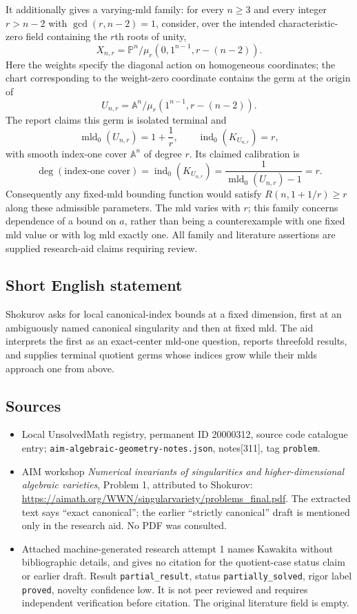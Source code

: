 \documentclass[11pt]{article}
\newcommand{\A}{\mathbb{A}}
\newcommand{\PP}{\mathbb{P}}
\begin{document}
It additionally gives a varying-mld family: for every $n\ge3$ and every integer $r>n-2$ with $\gcd(r,n-2)=1$, consider, over the intended characteristic-zero field containing the $r$th roots of unity,
\[X_{n,r}=\PP^n/\mu_r(0,1^{n-1},r-(n-2)).\]
Here the weights specify the diagonal action on homogeneous coordinates; the chart corresponding to the weight-zero coordinate contains the germ at the origin of
\[U_{n,r}=\A^n/\mu_r(1^{n-1},r-(n-2)).\]
The report claims this germ is isolated terminal and
\[\operatorname{mld}_0(U_{n,r})=1+\frac1r,\qquad\operatorname{ind}_0(K_{U_{n,r}})=r,\]
with smooth index-one cover $\A^n$ of degree $r$. Its claimed calibration is
\[\deg(\text{index-one cover})=\operatorname{ind}_0(K_{U_{n,r}})=\frac1{\operatorname{mld}_0(U_{n,r})-1}=r.\]
Consequently any fixed-mld bounding function would satisfy $R(n,1+1/r)\ge r$ along these admissible parameters. The mld varies with $r$; this family concerns dependence of a bound on $a$, rather than being a counterexample with one fixed mld value or with log mld exactly one. All family and literature assertions are supplied research-aid claims requiring review.
\subsection{Short English statement}
Shokurov asks for local canonical-index bounds at a fixed dimension, first at an ambiguously named canonical singularity and then at fixed mld. The aid interprets the first as an exact-center mld-one question, reports threefold results, and supplies terminal quotient germs whose indices grow while their mlds approach one from above.
\subsection{Sources}
\begin{itemize}
\item Local UnsolvedMath registry, permanent ID 20000312, source code catalogue entry; \texttt{aim-algebraic-geometry-notes.json}, notes[311], tag \texttt{problem}.
\item AIM workshop \emph{Numerical invariants of singularities and higher-dimensional algebraic varieties}, Problem 1, attributed to Shokurov: \url{https://aimath.org/WWN/singularvariety/problems_final.pdf}. The extracted text says ``exact canonical''; the earlier ``strictly canonical'' draft is mentioned only in the research aid. No PDF was consulted.
\item Attached machine-generated research attempt 1 names Kawakita without bibliographic details, and gives no citation for the quotient-case status claim or earlier draft. Result \texttt{partial\_result}, status \texttt{partially\_solved}, rigor label \texttt{proved}, novelty confidence low. It is not peer reviewed and requires independent verification before citation. The original literature field is empty.
\end{itemize}
\end{document}
